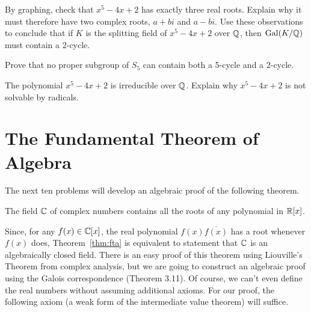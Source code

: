 \begin{problem}
    By graphing, check that $x^5-4x+2$ has exactly three real roots. Explain why it must therefore have two complex roots, $a+bi$ and $a-bi$. Use these observations to conclude that if $K$ is the splitting field of $x^5-4x+2$ over $\mathbb{Q}$, then $\operatorname{Gal}(K/\mathbb{Q})$ must contain a 2-cycle.
\end{problem}

\begin{problem}
    Prove that no proper subgroup of $S_5$ can contain both a 5-cycle and a 2-cycle.
\end{problem}

\begin{problem}\label{prob:insolq}
The polynomial $x^5-4x+2$ is irreducible over $\mathbb{Q}$. Explain why $x^5-4x+2$ is not solvable by radicals.
\begin{annotation}
\end{annotation}
\end{problem}

\section{The Fundamental Theorem of Algebra}\label{sec:fta}

The next ten problems will develop an algebraic proof of the following theorem.
\begin{annotation}
\end{annotation}

\begin{theorem}\label{thm:fta}
    The field $\mathbb{C}$ of complex numbers contains all the roots of any polynomial in $\mathbb{R}[x]$.
\end{theorem}

Since, for any $f(x) \in \mathbb{C}[x]$, the real polynomial $f(x)\overline{f(x)}$ has a root whenever $f(x)$ does, Theorem~\ref{thm:fta} is equivalent to statement that $\mathbb{C}$ is an algebraically closed field. There is an easy proof of this theorem using Liouville's Theorem from complex analysis, but we are going to construct an algebraic proof using the Galois correspondence (Theorem 3.11). Of course, we can't even define the real numbers without assuming additional axioms. For our proof, the following axiom (a weak form of the intermediate value theorem) will suffice.
\begin{annotation}
\end{annotation}

